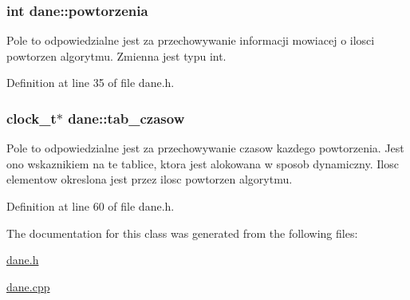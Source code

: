 \hypertarget{classdane_a77efb8d7494e984418802f6e7cc32d20}{
\subsubsection[{powtorzenia}]{\setlength{\rightskip}{0pt plus 5cm}int dane\-::powtorzenia}}\label{classdane_a77efb8d7494e984418802f6e7cc32d20}
Pole to odpowiedzialne jest za przechowywanie informacji mowiacej o ilosci powtorzen algorytmu. Zmienna jest typu int. 

Definition at line 35 of file dane.\-h.

\hypertarget{classdane_aa684a7eacd6787f62b0ed1115efc88ad}{
\subsubsection[{tab\-\_\-czasow}]{\setlength{\rightskip}{0pt plus 5cm}clock\-\_\-t$\ast$ dane\-::tab\-\_\-czasow}}\label{classdane_aa684a7eacd6787f62b0ed1115efc88ad}
Pole to odpowiedzialne jest za przechowywanie czasow kazdego powtorzenia. Jest ono wskaznikiem na te tablice, ktora jest alokowana w sposob dynamiczny. Ilosc elementow okreslona jest przez ilosc powtorzen algorytmu. 

Definition at line 60 of file dane.\-h.



The documentation for this class was generated from the following files\-:\begin{DoxyCompactItemize}
\item 
\hyperlink{dane_8h}{dane.\-h}\item 
\hyperlink{dane_8cpp}{dane.\-cpp}\end{DoxyCompactItemize}
